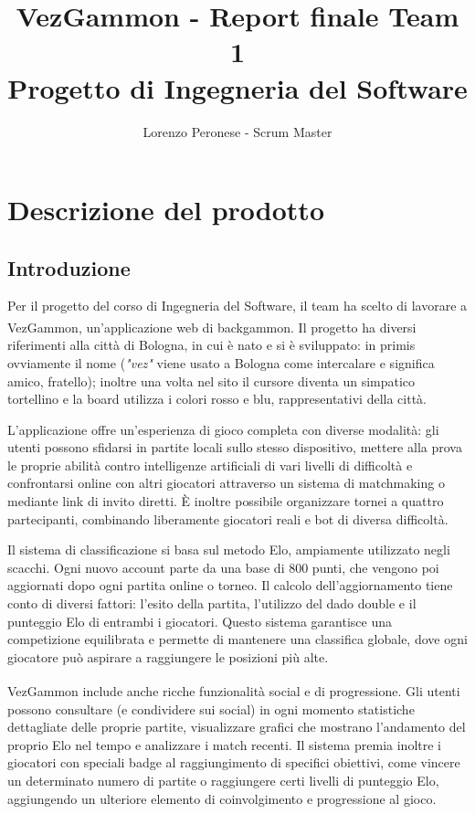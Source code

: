 \documentclass{article}
\title{VezGammon - Report finale Team 1 \\ \large Progetto di Ingegneria del Software}
\author{Lorenzo Peronese - Scrum Master}
\begin{document}
\maketitle

\tableofcontents

\newpage

\section{Descrizione del prodotto}
\subsection{Introduzione}
Per il progetto del corso di Ingegneria del Software, il team ha scelto di lavorare a VezGammon\textsuperscript{\texttrademark}, 
un'applicazione web di backgammon. Il progetto ha diversi riferimenti alla città di Bologna, in cui è nato e si è sviluppato: 
in primis ovviamente il nome (\textit{"vez"} viene usato a Bologna come intercalare e significa amico, fratello); inoltre una 
volta nel sito il cursore diventa un simpatico tortellino e la board utilizza i colori rosso e blu, rappresentativi della città.

L'applicazione offre un'esperienza di gioco completa con diverse modalità: gli utenti possono sfidarsi in partite locali sullo 
stesso dispositivo, mettere alla prova le proprie abilità contro intelligenze artificiali di vari livelli di difficoltà e confrontarsi 
online con altri giocatori attraverso un sistema di matchmaking o mediante link di invito diretti. È inoltre possibile organizzare 
tornei a quattro partecipanti, combinando liberamente giocatori reali e bot di diversa difficoltà.

Il sistema di classificazione si basa sul metodo Elo, ampiamente utilizzato negli scacchi. Ogni nuovo account parte da una base 
di 800 punti, che vengono poi aggiornati dopo ogni partita online o torneo. Il calcolo dell'aggiornamento tiene conto di diversi 
fattori: l'esito della partita, l'utilizzo del dado double e il punteggio Elo di entrambi i giocatori. Questo sistema garantisce 
una competizione equilibrata e permette di mantenere una classifica globale, dove ogni giocatore può aspirare a raggiungere le 
posizioni più alte.

VezGammon\textsuperscript{\texttrademark} include anche ricche funzionalità social e di progressione. Gli utenti possono consultare 
(e condividere sui social) in ogni momento statistiche dettagliate delle proprie partite, visualizzare grafici che mostrano l'andamento 
del proprio Elo nel tempo e analizzare i match recenti. Il sistema premia inoltre i giocatori con speciali badge al raggiungimento 
di specifici obiettivi, come vincere un determinato numero di partite o raggiungere certi livelli di punteggio Elo, aggiungendo 
un ulteriore elemento di coinvolgimento e progressione al gioco.
\end{document}

